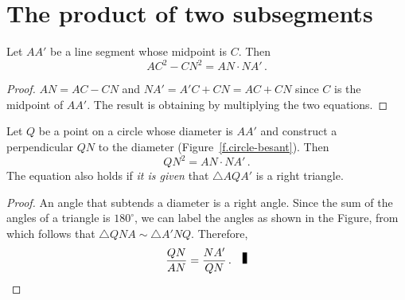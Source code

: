 
\section{The product of two subsegments}

\begin{theorem}\label{thm.dividing}
Let $AA'$ be a line segment whose midpoint is $C$. Then 
\[
AC^2-CN^2=AN\cdot NA'\,.
\]
\end{theorem}

\begin{center}
\end{center}

\begin{proof}
$AN=AC-CN$ and $NA'=A'C+CN=AC+CN$ since $C$ is the midpoint of $AA'$. The result is obtaining by multiplying the two equations.\hqed
\end{proof}


\begin{theorem}\label{thm.alt-hypo}
Let $Q$ be a point on a circle whose diameter is $AA'$ and construct a perpendicular $QN$ to the diameter (Figure~\ref{f.circle-besant}). Then
\[
QN^2=AN\cdot NA'\,.
\]
The equation also holds if \emph{it is given} that $\triangle AQA'$ is a right triangle.
\end{theorem}

\begin{proof}
An angle that subtends a diameter is a right angle. Since the sum of the angles of a triangle is $180^\circ$, we can label the angles as shown in the Figure, from which follows that $\triangle QNA \sim\triangle A'NQ$. Therefore,
\[
\frac{QN}{AN} = \frac{NA'}{QN}\,.\fqed
\]
\end{proof}

